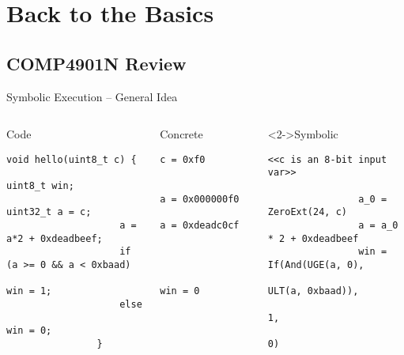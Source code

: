 \documentclass[xcolor={dvipsnames}]{beamer}
\begin{document}
\section[Back to the Basics]{Back to the Basics\\\vspace{-5pt}{\tiny Early Stages of Reverse-Engineering Grief and Trauma}}


\subsection{COMP4901N Review}
\begin{frame}[fragile]{Symbolic Execution -- General Idea}
    \begin{columns}[t]
        \begin{block}{Code}
            \begin{lstlisting}[style=plainc,basicstyle=\tiny\ttfamily,gobble=16]
                void hello(uint8_t c) {
                    uint8_t win;
                    uint32_t a = c;
                    a = a*2 + 0xdeadbeef;
                    if (a >= 0 && a < 0xbaad)
                        win = 1;
                    else
                        win = 0;
                }
            \end{lstlisting}
        \end{block}
        \begin{block}{Concrete}
            \begin{lstlisting}[style=plain2,basicstyle=\tiny\ttfamily,gobble=16]
                c = 0xf0

                a = 0x000000f0
                a = 0xdeadc0cf


                
                win = 0
            \end{lstlisting}
        \end{block}
        \vskip-0.5pt %
        \begin{block}<2->{Symbolic}
            \vskip-0.9pt %
            \begin{lstlisting}[style=plain2,keywords={If,And,UGE,ULT,ZeroExt},basicstyle=\tiny\ttfamily,keywordstyle=\color{blue!80},gobble=16]
                <<c is an 8-bit input var>>

                a_0 = ZeroExt(24, c)
                a = a_0 * 2 + 0xdeadbeef
                win = If(And(UGE(a, 0),
                             ULT(a, 0xbaad)),
                         1,
                         0)
            \end{lstlisting}
        \end{block}
    \end{columns}
\end{frame}
\end{document}
